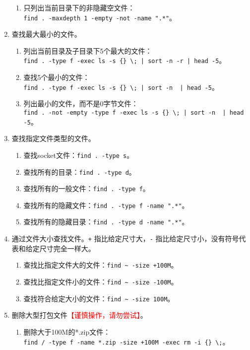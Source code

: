 \begin{enumerate}
\begin{enumerate}
      \item 只列出当前目录下的非隐藏空文件：\\ \verb|find . -maxdepth 1 -empty -not -name ".*"|。
    \end{enumerate}
  \item 查找最大最小的文件。
    \begin{enumerate}
      \item 列出当前目录及子目录下5个最大的文件：\\ \verb=find . -type f -exec ls -s {} \; | sort -n -r | head -5=。
      \item 查找5个最小的文件：\\ \verb=find . -type f -exec ls -s {} \; | sort -n  | head -5=。
      \item 列出最小的文件，而不是0字节文件：\\ \verb=find . -not -empty -type f -exec ls -s {} \; | sort -n  | head -5=。
    \end{enumerate}
  \item 查找指定文件类型的文件。
    \begin{enumerate}
      \item 查找socket文件：\verb|find . -type s|。
      \item 查找所有的目录：\verb|find . -type d|。
      \item 查找所有的一般文件：\verb|find . -type f|。
      \item 查找所有的隐藏文件：\verb|find . -type f -name ".*"|。
      \item 查找所有的隐藏目录：\verb|find . -type d -name ".*"|。
    \end{enumerate}
  \item 通过文件大小查找文件。\verb|+| 指比给定尺寸大，\verb|-| 指比给定尺寸小，没有符号代表和给定尺寸完全一样大。 
    \begin{enumerate}
      \item 查找比指定文件大的文件：\verb|find ~ -size +100M|。
      \item 查找比指定文件小的文件：\verb|find ~ -size -100M|。
      \item 查找符合给定大小的文件：\verb|find ~ -size 100M|。
    \end{enumerate}
  \item 删除大型打包文件\textcolor{red}{【谨慎操作，请勿尝试】}。
    \begin{enumerate}
      \item 删除大于100M的*.zip文件：\\ \verb|find / -type f -name *.zip -size +100M -exec rm -i {} \;|。

\end{enumerate}
\end{enumerate}
